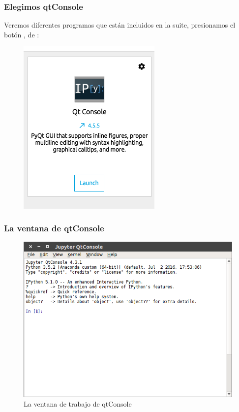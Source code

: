 {\begin{frame}
\frametitle{Elegimos qtConsole}
Veremos diferentes programas que están incluidos en la suite, presionamos el botón , de :
\begin{figure}
	\centering
	\includegraphics[scale=0.35]{qtConsole_00.png}
\end{figure}
\end{frame}
\begin{frame}
\frametitle{La ventana de qtConsole}
\begin{figure}
	\centering
	\includegraphics[scale=0.35]{qtConsole_01.png}
	\caption{La ventana de trabajo de qtConsole}
\end{figure}
\end{frame}
}
